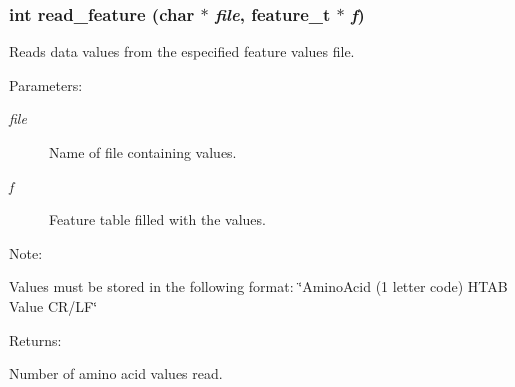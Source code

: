 \subsubsection{\setlength{\rightskip}{0pt plus 5cm}int read\_\-feature (char $\ast$ {\em file}, {\bf feature\_\-t} $\ast$ {\em f})}\label{P__desc_8h_a0}


Reads data values from the especified feature values file.



 \begin{Desc}
\item[Parameters: ]\par
\begin{description}
\item[{\em 
file}]Name of file containing values. \item[{\em 
f}]Feature table filled with the values.\end{description}
\end{Desc}
\begin{Desc}
\item[Note: ]\par
Values must be stored in the following format: \char`\"{}Amino\-Acid (1 letter code) HTAB Value CR/LF\char`\"{}\end{Desc}
\begin{Desc}
\item[Returns: ]\par
Number of amino acid values read. \end{Desc}
